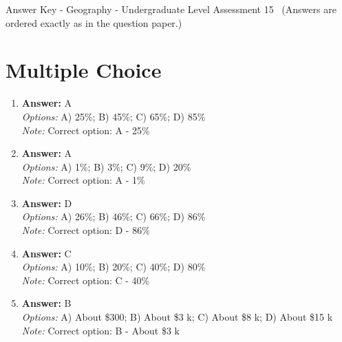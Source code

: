 \documentclass[12pt]{article}
\begin{document}
\begin{center}
Answer Key - Geography - Undergraduate Level Assessment 15 \
\small (Answers are ordered exactly as in the question paper.)
\end{center}

\section*{Multiple Choice}
\begin{enumerate}[label=\arabic*.]
\item \textbf{Answer:} A
\\ \textit{Options:} A) 25\%; B) 45\%; C) 65\%; D) 85\%
\\ \textit{Note:} Correct option: A - 25\%
\item \textbf{Answer:} A
\\ \textit{Options:} A) 1\%; B) 3\%; C) 9\%; D) 20\%
\\ \textit{Note:} Correct option: A - 1\%
\item \textbf{Answer:} D
\\ \textit{Options:} A) 26\%; B) 46\%; C) 66\%; D) 86\%
\\ \textit{Note:} Correct option: D - 86\%
\item \textbf{Answer:} C
\\ \textit{Options:} A) 10\%; B) 20\%; C) 40\%; D) 80\%
\\ \textit{Note:} Correct option: C - 40\%
\item \textbf{Answer:} B
\\ \textit{Options:} A) About \$300; B) About \$3 k; C) About \$8 k; D) About \$15 k
\\ \textit{Note:} Correct option: B - About \$3 k
\end{enumerate}
\end{document}
